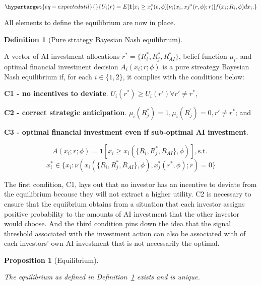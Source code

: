 \documentclass[
]{article}
\theoremstyle{plain}
\newtheorem{proposition}{Proposition}[section]
\theoremstyle{definition}
\newtheorem{definition}{Definition}[section]
\theoremstyle{remark}
\begin{document}
\begin{equation}\protect\hypertarget{eq-expectedutil}{}{
U_i(r) = E[\mathbf{1}[x_i \geq x_i^*(e, \phi)] \nu_i(x_i, xj^*(r, \phi); r)]f(x_i;R_i, \phi)dx_i.
}\label{eq-expectedutil}\end{equation}

All elements to define the equilibrium are now in place.

\begin{definition}[Pure strategy Bayesian Nash
equilibrium]\protect\hypertarget{def-equilibrium}{}\label{def-equilibrium}

A vector of AI investment allocations
\(r^* = \{R_i^*, R_j^*, R_{AI}^*\}\), belief function \(\mu_i\), and
optimal financial investment decision \(A_i(x_i;r;\phi)\) is a pure
streategy Bayesian Nash equilibrium if, for each \(i \in \{1,2\}\), it
complies with the conditions below:

\textbf{C1 - no incentives to deviate}.
\(U_i(r^*) \geq U_i(r') \forall r' \neq r^*\),

\textbf{C2 - correct strategic anticipation}.
\(\mu_i(R_j^*)=1, \mu_i(R_j^{'}) = 0, r' \neq r^*\); and

\textbf{C3 - optimal financial investment even if sub-optimal AI
investment}.

\[
A(x_i;r;\phi) = \mathbf{1}[x_i \geq x_i(\{R_i, R_j^*, R_{AI}\}, \phi)], \text{s.t.  }
\] \[
x_i^* \in \{x_i : \nu(x_i(\{R_i, R_j^*, R_{AI}\}, \phi), x_j^*(r^*, \phi); r) = 0 \}
\]

\end{definition}

The first condition, C1, lays out that no investor has an incentive to
deviate from the equilibrium because they will not extract a higher
utility. C2 is necessary to ensure that the equiibrium obtains from a
situation that each investor assigns positive probability to the amounts
of AI investment that the other investor would choose. And the third
condition pins down the idea that the signal threshold associated with
the investment action can also be associated with of each investors' own
AI investment that is not necessarily the optimal.

\begin{proposition}[Equilibrium]\protect\hypertarget{prp-equilibrium}{}\label{prp-equilibrium}

The equilibrium as defined in Definition~\ref{def-equilibrium} exists
and is unique.

\end{proposition}
\end{document}
